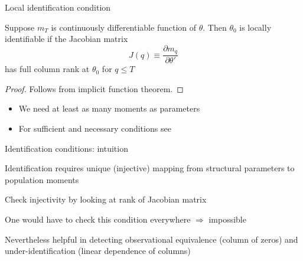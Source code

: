 \documentclass[handout,usepdftitle=false,xcolor=dvipsnames,aspectratio=169]{beamer}
\begin{document}
\begin{frame}{Local identification condition}
  \begin{theorem}
    Suppose $m_T$ is continuously differentiable function of $\theta$. Then $\theta_0$ is locally identifiable if the Jacobian matrix
    \begin{equation}
      J(q) \equiv \frac{{\partial {m_q}}}{{\partial \theta '}} \label{eq:Jacobian}
    \end{equation}
    has full column rank at $\theta_0$ for $q\leq T$
  \end{theorem}
  \begin{proof}
    Follows from implicit function theorem.
  \end{proof}
  \begin{itemize}
    \item We need at least as many moments as parameters
    \item For sufficient and necessary conditions see \textcite{Iskrev2010}
  \end{itemize}
\end{frame}

\begin{frame}{Identification conditions: intuition}

  \begin{witemize}
    \item Identification requires unique (injective) mapping from structural parameters to population moments
    \item Check injectivity by looking at rank of Jacobian matrix
    \item One would have to check this condition everywhere $\Rightarrow$ impossible
    \item Nevertheless helpful in detecting observational equivalence (column of zeros) and under-identification (linear dependence of columns)
  \end{witemize}
\end{frame}
\end{document}
